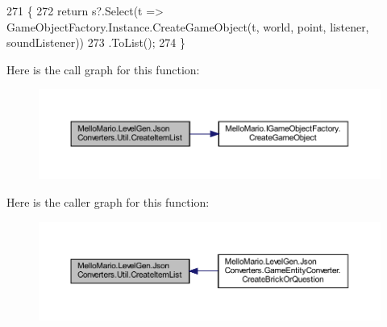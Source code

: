 \begin{DoxyCode}
271         \{
272             \textcolor{keywordflow}{return} s?.Select(t => GameObjectFactory.Instance.CreateGameObject(t, world, point, listener, 
      soundListener))
273                 .ToList();
274         \}
\end{DoxyCode}
Here is the call graph for this function\+:
\nopagebreak
\begin{figure}[H]
\begin{center}
\leavevmode
\includegraphics[width=350pt]{classMelloMario_1_1LevelGen_1_1JsonConverters_1_1Util_af87c2b204c27e1c032984b7606d38057_cgraph}
\end{center}
\end{figure}
Here is the caller graph for this function\+:
\nopagebreak
\begin{figure}[H]
\begin{center}
\leavevmode
\includegraphics[width=350pt]{classMelloMario_1_1LevelGen_1_1JsonConverters_1_1Util_af87c2b204c27e1c032984b7606d38057_icgraph}
\end{center}
\end{figure}
\mbox{\label{classMelloMario_1_1LevelGen_1_1JsonConverters_1_1Util_adaad228e6d75b4457e8073b722af6ed0}} 

